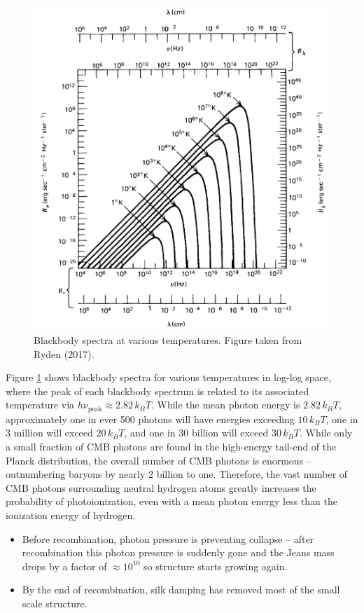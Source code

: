 \documentclass[a4paper,11pt]{article}
\begin{document}
\begin{figure}[h]
    \includegraphics[width=14cm]{figures/blackbody.png}
    \centering
    \caption{Blackbody spectra at various temperatures. Figure taken from Ryden (2017).}
    \label{fig:blackbody}
\end{figure}

{\noindent}Figure \ref{fig:blackbody} shows blackbody spectra for various temperatures in log-log space, where the peak of each blackbody spectrum is related to its associated temperature via $h\nu_\mathrm{peak} \approx 2.82\,k_BT$. While the mean photon energy is $2.82\,k_BT$, approximately one in ever 500 photons will have energies exceeding $10\,k_BT$, one in 3 million will exceed $20\,k_BT$, and one in 30 billion will exceed $30\,k_BT$. While only a small fraction of CMB photons are found in the high-energy tail-end of the Planck distribution, the overall number of CMB photons is enormous -- outnumbering baryons by nearly 2 billion to one. Therefore, the vast number of CMB photons surrounding neutral hydrogen atoms greatly increases the probability of photoionization, even with a mean photon energy less than the ionization energy of hydrogen.

\begin{itemize}
    \item Before recombination, photon pressure is preventing collapse -- after recombination this photon pressure is suddenly gone and the Jeans mass drops by a factor of $\approx 10^{10}$ so structure starts growing again.
    \item By the end of recombination, silk damping has removed most of the small scale structure.
\end{itemize}
\end{document}
